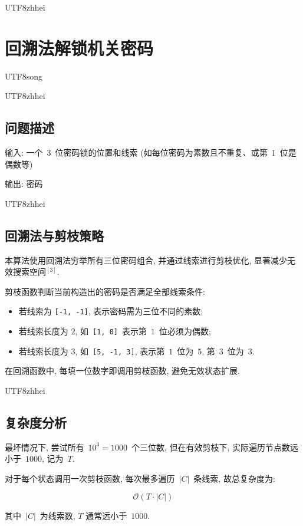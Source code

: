 \documentclass[10.5pt,compsoc]{CjC}
\theoremstyle{mystyle}
\begin{document}
\begin{CJK*}{UTF8}{zhhei}
\vskip 1mm
\section{回溯法解锁机关密码}
\end{CJK*}

\begin{CJK*}{UTF8}{song}
\begin{CJK*}{UTF8}{zhhei}\subsection{问题描述}\end{CJK*}

输入: 一个~$3$~位密码锁的位置和线索 (如每位密码为素数且不重复、或第~$1$~位是偶数等)

输出: 密码

\begin{CJK*}{UTF8}{zhhei}\subsection{回溯法与剪枝策略}\end{CJK*}

本算法使用回溯法穷举所有三位密码组合,
并通过线索进行剪枝优化, 显著减少无效搜索空间$^{[3]}$.

剪枝函数判断当前构造出的密码是否满足全部线索条件:
\begin{itemize}
  \item 若线索为 \texttt{[-1, -1]}, 表示密码需为三位不同的素数;
  \item 若线索长度为 $2$, 如~\texttt{[1, 0]}~表示第~$1$~位必须为偶数;
  \item 若线索长度为 $3$, 如~\texttt{[5, -1, 3]}, 表示第~$1$~位为~$5$, 第~$3$~位为~$3$.
\end{itemize}

在回溯函数中, 每填一位数字即调用剪枝函数, 避免无效状态扩展.


\begin{CJK*}{UTF8}{zhhei}\subsection{复杂度分析}\end{CJK*}

最坏情况下, 尝试所有~$10^3 = 1000$~个三位数,
但在有效剪枝下, 实际遍历节点数远小于~$1000$, 记为~$T$.

对于每个状态调用一次剪枝函数, 每次最多遍历~$|C|$~条线索, 故总复杂度为:

\[
\mathcal{O}(T \cdot |C|)
\]

其中~$|C|$~为线索数, $T$ 通常远小于~$1000$.

\end{CJK*}
\end{document}
